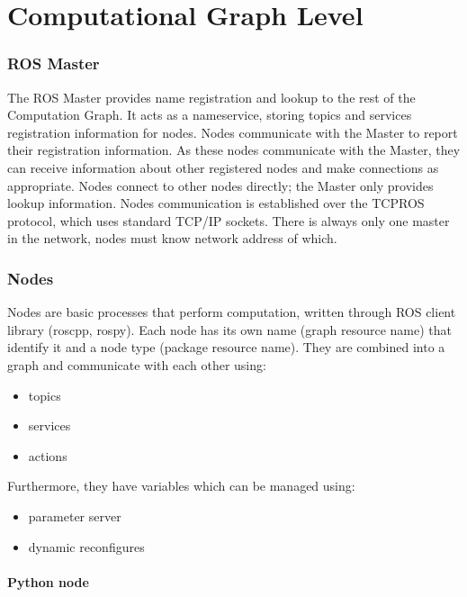 \part{Computational Graph Level}


    \section{ROS Master}
        The ROS Master provides name registration and lookup to the rest of the Computation Graph.
        It acts as a nameservice, storing topics and services registration information for nodes. Nodes communicate with the Master to report 
        their registration information.
        As these nodes communicate with the Master, they can receive information about other registered nodes and make connections as appropriate.
        Nodes connect to other nodes directly; the Master only provides lookup information.
        Nodes communication is established over the TCPROS protocol, which uses standard TCP/IP sockets.
        There is always only one master in the network, nodes must know network address of which.


    \section{Nodes}
        Nodes are basic processes that perform computation, written through ROS client library (roscpp, rospy). Each node has its own name 
        (graph resource name) that identify it and a node type (package resource name).
        They are combined into a graph and communicate with each other using:
        \begin{itemize}
            \item topics
            \item services
            \item actions
        \end{itemize}
        Furthermore, they have variables which can be managed using:
        \begin{itemize}
            \item parameter server
            \item dynamic reconfigures
        \end{itemize}    


        \subsection{Python node}
        
